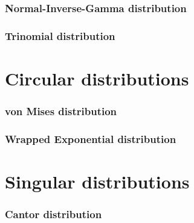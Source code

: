 \documentclass[a4paper,11pt]{article}
\theoremstyle{plain}
\theoremstyle{definition}
\begin{document}
	\section{Normal-Inverse-Gamma distribution}
	\section{Trinomial distribution}
	
	\pagebreak
	\part{Circular distributions}
	\section{von Mises distribution}
	\section{Wrapped Exponential distribution}
	
	\pagebreak
	\part{Singular distributions}
	\section{Cantor distribution}
	
\end{document}
